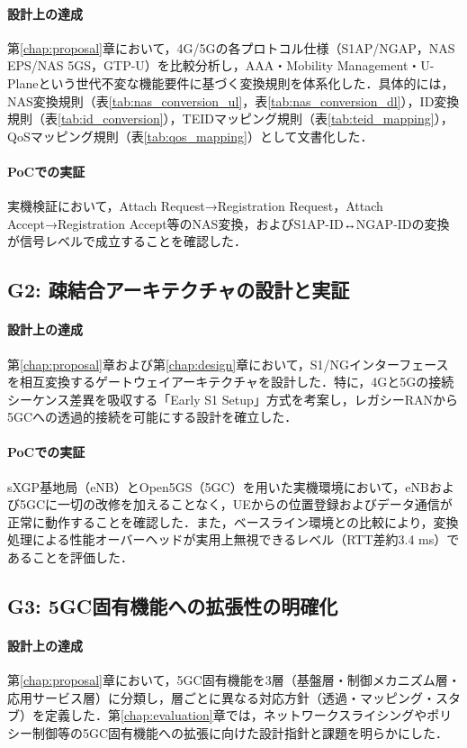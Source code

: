 \paragraph{設計上の達成}
第\ref{chap:proposal}章において，4G/5Gの各プロトコル仕様（S1AP/NGAP，NAS EPS/NAS 5GS，GTP-U）を比較分析し，AAA・Mobility Management・U-Planeという世代不変な機能要件に基づく変換規則を体系化した．具体的には，NAS変換規則（表\ref{tab:nas_conversion_ul}，表\ref{tab:nas_conversion_dl}），ID変換規則（表\ref{tab:id_conversion}），TEIDマッピング規則（表\ref{tab:teid_mapping}），QoSマッピング規則（表\ref{tab:qos_mapping}）として文書化した．

\paragraph{PoCでの実証}
実機検証において，Attach Request→Registration Request，Attach Accept→Registration Accept等のNAS変換，およびS1AP-ID↔NGAP-IDの変換が信号レベルで成立することを確認した．

\subsection{G2: 疎結合アーキテクチャの設計と実証}
\paragraph{設計上の達成}
第\ref{chap:proposal}章および第\ref{chap:design}章において，S1/NGインターフェースを相互変換するゲートウェイアーキテクチャを設計した．特に，4Gと5Gの接続シーケンス差異を吸収する「Early S1 Setup」方式を考案し，レガシーRANから5GCへの透過的接続を可能にする設計を確立した．

\paragraph{PoCでの実証}
sXGP基地局（eNB）とOpen5GS（5GC）を用いた実機環境において，eNBおよび5GCに一切の改修を加えることなく，UEからの位置登録およびデータ通信が正常に動作することを確認した．また，ベースライン環境との比較により，変換処理による性能オーバーヘッドが実用上無視できるレベル（RTT差約3.4 ms）であることを評価した．

\subsection{G3: 5GC固有機能への拡張性の明確化}
\label{subsec:g3}
\paragraph{設計上の達成}
第\ref{chap:proposal}章において，5GC固有機能を3層（基盤層・制御メカニズム層・応用サービス層）に分類し，層ごとに異なる対応方針（透過・マッピング・スタブ）を定義した．第\ref{chap:evaluation}章では，ネットワークスライシングやポリシー制御等の5GC固有機能への拡張に向けた設計指針と課題を明らかにした．

